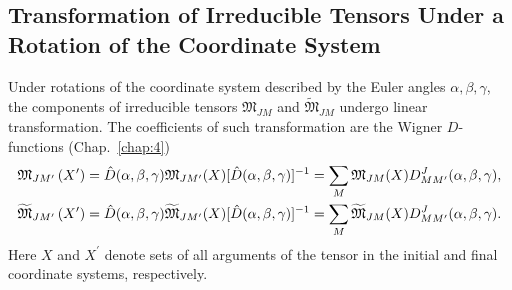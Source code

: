 \subsection{Transformation of Irreducible Tensors Under a Rotation of the Coordinate System}\label{sec:3.1.3}
Under rotations of the coordinate system described by the Euler angles $\alpha, \beta, \gamma$, the components of irreducible tensors $\mathfrak{M}_{J M}$ and $\widetilde{\mathfrak{M}}_{J M}$ undergo linear transformation. The coefficients of such transformation are the Wigner $D$-functions (Chap.~\ref{chap:4})
\begin{align}
& \mathfrak{M}_{J M^{\prime}}\left(X^{\prime}\right)=\hat{D}(\alpha, \beta, \gamma) \mathfrak{M}_{J M^{\prime}}(X)[\hat{D}(\alpha, \beta, \gamma)]^{-1}=\sum_{M} \mathfrak{M}_{J M}(X) D_{M M^{\prime}}^{J}(\alpha, \beta, \gamma),  \notag\\
& \widetilde{\mathfrak{M}}_{J M^{\prime}}\left(X^{\prime}\right)=\hat{D}(\alpha, \beta, \gamma) \widetilde{\mathfrak{M}}_{J M^{\prime}}(X)[\hat{D}(\alpha, \beta, \gamma)]^{-1}=\sum_{M} \widetilde{\mathfrak{M}}_{J M}(X) D_{M M^{\prime}}^{J}(\alpha, \beta, \gamma) . \label{eq:3:1:11}
\end{align}
Here $X$ and $X^{\prime}$ denote sets of all arguments of the tensor in the initial and final coordinate systems, respectively.

